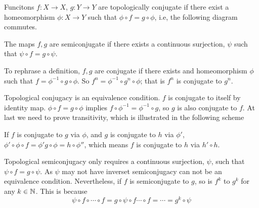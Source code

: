 \begin{defn}
Funcitons $f: X \rightarrow X$, $g:  Y \rightarrow Y$ are topologically conjugate if there exist a homeomorphism $\phi: X \rightarrow Y$ such that 
$\phi \circ f = g \circ \phi$,
i.e, the following diagram commutes.
\begin{center}
\end{center}

The maps $f,g$ are semiconjugate if there exists a continuous surjection, $\psi$ such that $\psi \circ f = g \circ \psi$.
\end{defn}


To rephrase a definition, $f,g$ are conjugate if there exists and homeomorphism $\phi$ such that $f = \phi^{-1} \circ g \circ \phi$.
So $f^{n} = \phi^{-1} \circ g^{n} \circ \phi$; that is $f^n$ is conjugate to $g^n$.

Topological conjugacy is an equivalence condition. 
$f$ is conjugate to itself by identity map. 
$\phi \circ f = g \circ \phi$ implies $f \circ \phi^{-1} = \phi^{-1} \circ g$, so $g$ is also conjugate to $f$.
At last we need to prove transitivity, which is illustrated in the following scheme
\begin{center}
\end{center}
If $f$  is conjugate to $g$ via $\phi$, and $g$ is conjugate to $h$ via $\phi'$, $\phi' \circ \phi \circ f = \phi' g \circ \phi = h \circ \phi'' $, which means $f$ is conjugate to $h$ via $h' \circ h$. 



Topological semiconjugacy only requires a continuous surjection, $\psi$, such that $\psi \circ f = g \circ \psi$. 
As $\psi$ may not have inverset semiconjugacy can not be an equivalence condition.
Nevertheless, if $f$ is semiconjugate to $g$, so is $f^{k}$ to $g^{k}$ for any $k \in \mathbb{N}$. 
This is because 
$$
	\psi \circ f\circ \cdots \circ f = g \circ \psi \circ f \cdots \circ f = \cdots = g^k \circ \psi
$$

